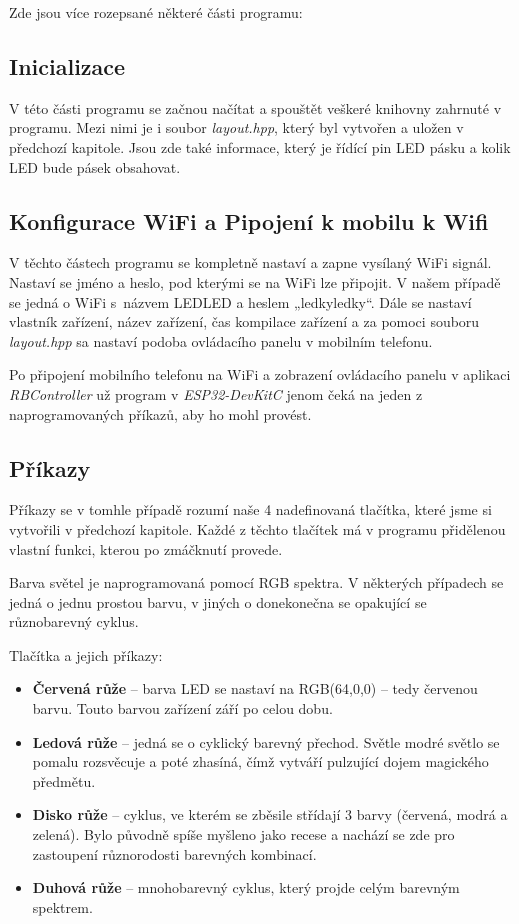 Zde jsou více rozepsané některé části programu:


\subsection{Inicializace}
V této části programu se začnou načítat a spouštět veškeré knihovny zahrnuté v programu. Mezi nimi je i soubor \textit{layout.hpp}, který byl vytvořen a uložen v předchozí kapitole. Jsou zde také informace, který je řídící pin LED pásku a kolik LED bude pásek obsahovat.


\subsection{Konfigurace WiFi a Pipojení k mobilu k Wifi}
V těchto částech programu se kompletně nastaví a zapne vysílaný WiFi signál. Nastaví se jméno a heslo, pod kterými se na WiFi lze připojit. V našem případě se jedná o WiFi s~názvem LEDLED a heslem „ledkyledky“. Dále se nastaví vlastník zařízení, název zařízení, čas kompilace zařízení a za pomoci souboru \textit{layout.hpp} sa nastaví podoba ovládacího panelu v mobilním telefonu. 

Po připojení mobilního telefonu na WiFi a zobrazení ovládacího panelu v aplikaci \textit{RBController} už program v \textit{ESP32-DevKitC} jenom čeká na jeden z naprogramovaných příkazů, aby ho mohl provést.


\subsection{Příkazy}
Příkazy se v tomhle případě rozumí naše 4 nadefinovaná tlačítka, které jsme si vytvořili v předchozí kapitole. Každé z těchto tlačítek má v programu přidělenou vlastní funkci, kterou po zmáčknutí provede.

Barva světel je naprogramovaná pomocí RGB spektra. V některých případech se jedná o jednu prostou barvu, v jiných o donekonečna se opakující se různobarevný cyklus. 

Tlačítka a jejich příkazy: 
\begin{itemize}
	\item \textbf{Červená růže} – barva LED se nastaví na RGB(64,0,0) – tedy červenou barvu. Touto barvou zařízení září po celou dobu. 
	
	\item \textbf{Ledová růže} – jedná se o cyklický barevný přechod. Světle modré světlo se pomalu rozsvěcuje a poté zhasíná, čímž vytváří pulzující dojem magického předmětu. 
	
	\item \textbf{Disko růže} – cyklus, ve kterém se zběsile střídají 3 barvy (červená, modrá a zelená). Bylo původně spíše myšleno jako recese a nachází se zde pro zastoupení různorodosti barevných kombinací. 
	
	\item \textbf{Duhová růže} – mnohobarevný cyklus, který projde celým barevným spektrem. 
\end{itemize}


